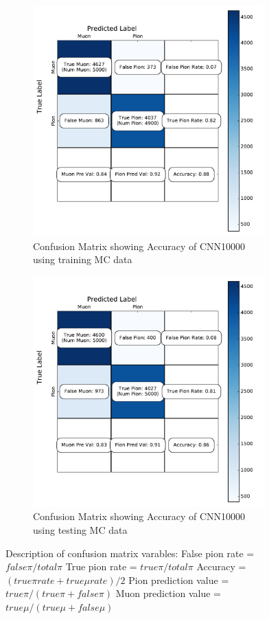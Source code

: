 \begin{figure}[htp!]
\centering
	\begin{subfigure}[b]{.7\textwidth}
	\includegraphics[width=\textwidth,height=3.5in]{figs/train_confusion.pdf}
	\caption{Confusion Matrix showing Accuracy of CNN10000 using training MC data}
	\label{fig:confusion}
	\end{subfigure}
	\quad
	\begin{subfigure}[b]{.7\textwidth}
	\includegraphics[width=\textwidth,height=3.5in]{figs/val_confusion.pdf}
	\caption{Confusion Matrix showing Accuracy of CNN10000 using testing MC data}
	\label{fig:confusion_test}
	\end{subfigure}
	\quad
\caption{Description of confusion matrix varables: False pion rate = $false \pi/ total \pi$ True pion rate = $true \pi/total \pi$ Accuracy = $(true \pi rate + true \mu rate)/2$ Pion prediction value = $true \pi/(true \pi + false \pi)$ Muon prediction value = $true \mu/(true \mu + false \mu)$}
\label{fig:CNN_train}
\end{figure}
